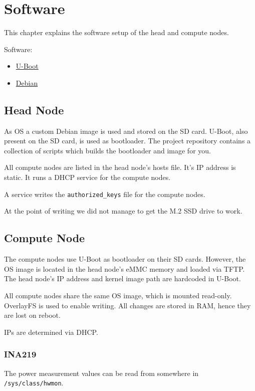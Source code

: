 \chapter{Software}

This chapter explains the software setup of the head and compute nodes.

Software:

\begin{itemize}
	\item \href{https://www.denx.de/wiki/U-Boot}{U-Boot}
	\item \href{https://www.debian.org/}{Debian}
\end{itemize}

\section{Head Node}

As OS a custom Debian image is used and stored on the SD card.
U-Boot, also present on the SD card, is used as bootloader.
The project repository contains a collection of scripts which builds the bootloader and image for you.

All compute nodes are listed in the head node's hosts file.
It's IP address is static.
It runs a DHCP service for the compute nodes.

A service writes the \texttt{authorized\_keys} file for the compute nodes.

At the point of writing we did not manage to get the M.2 SSD drive to work.

\section{Compute Node}

The compute nodes use U-Boot as bootloader on their SD cards.
However, the OS image is located in the head node's eMMC memory and loaded via TFTP.
The head node's IP address and kernel image path are hardcoded in U-Boot.

All compute nodes share the same OS image, which is mounted read-only.
OverlayFS is used to enable writing.
All changes are stored in RAM, hence they are lost on reboot.

IPs are determined via DHCP.

\subsection{INA219}

The power measurement values can be read from somewhere in \texttt{/sys/class/hwmon}.

